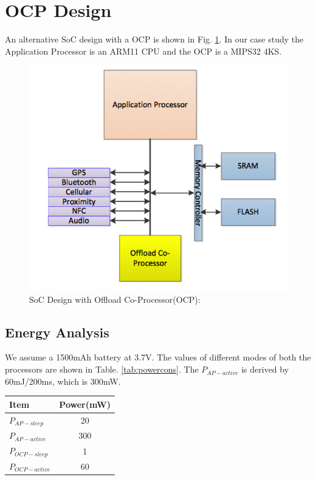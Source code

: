 \documentclass[conference]{IEEEtran}
\begin{document}
\section{OCP Design}
An alternative SoC design with a OCP is shown in Fig. \ref{fig:AP}. In our case study the Application Processor is an ARM11 CPU and the OCP is a MIPS32 4KS.

\begin{figure}[htbp]
	\includegraphics[width=\linewidth]{img/Pictures/AP.png}
	\centering
    \caption{SoC Design with Offload Co-Processor(OCP): \cite{b2}}
    \label{fig:AP}
\end{figure}

\subsection{Energy Analysis}

We assume a 1500mAh battery at 3.7V. The values of different modes of both the processors are shown in Table. \ref{tab:powercons}. The $P_{AP-active}$ is derived by 60mJ/200ms, which is 300mW.

\begin{center}
 \label{tab:powercons}
\begin{tabular}{ |l|c| } 
\hline
\textbf{Item} & \textbf{Power(mW)} \\
\hline
$P_{AP-sleep}$ & 20\\
\hline
$P_{AP-active}$ & 300 \\
\hline
$P_{OCP-sleep}$ & 1 \\ 
\hline
$P_{OCP-active}$ & 60 \\ 
\hline
\end{tabular}
\end{center}
\end{document}
